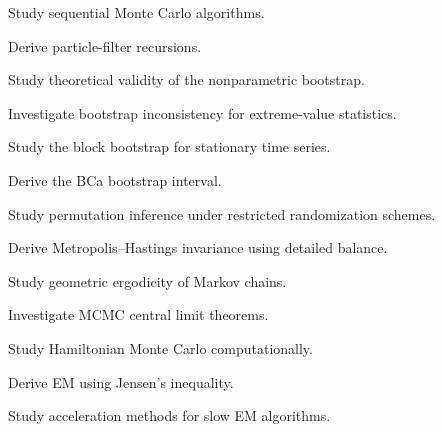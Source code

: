 \begin{exercise}[4]
Study sequential Monte Carlo algorithms.
\end{exercise}

\begin{exercise}[4]
Derive particle-filter recursions.
\end{exercise}

\begin{exercise}[4]
Study theoretical validity of the nonparametric bootstrap.
\end{exercise}

\begin{exercise}[4]
Investigate bootstrap inconsistency for extreme-value statistics.
\end{exercise}

\begin{exercise}[4]
Study the block bootstrap for stationary time series.
\end{exercise}

\begin{exercise}[4]
Derive the BCa bootstrap interval.
\end{exercise}

\begin{exercise}[4]
Study permutation inference under restricted randomization schemes.
\end{exercise}

\begin{exercise}[4]
Derive Metropolis--Hastings invariance using detailed balance.
\end{exercise}

\begin{exercise}[4]
Study geometric ergodicity of Markov chains.
\end{exercise}

\begin{exercise}[4]
Investigate MCMC central limit theorems.
\end{exercise}

\begin{exercise}[4]
Study Hamiltonian Monte Carlo computationally.
\end{exercise}

\begin{exercise}[4]
Derive EM using Jensen's inequality.
\end{exercise}

\begin{exercise}[4]
Study acceleration methods for slow EM algorithms.
\end{exercise}

